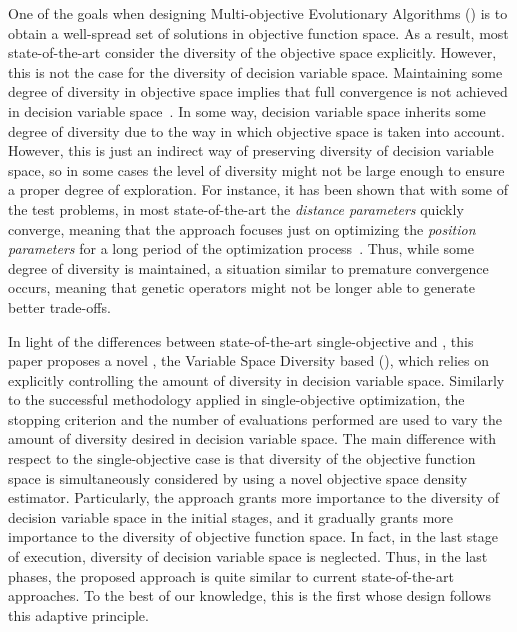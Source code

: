 One of the goals when designing Multi-objective Evolutionary Algorithms (\MOEAS{}) is to obtain a well-spread 
set of solutions in objective function space.
%
As a result, most state-of-the-art \MOEAS{} consider the diversity of the objective space explicitly.
%
However, this is not the case for the diversity of decision variable space.
%
Maintaining some degree of diversity in objective space implies that full convergence 
is not achieved in decision variable space~\citep{Joel:GDE3_CEC09}.
%
In some way, decision variable space inherits some degree of diversity due to the way in which objective space is 
taken into account. 
%
However, this is just an indirect way of preserving diversity of decision variable space, so 
in some cases the level of diversity might not be large enough to ensure a proper degree of exploration.
%
For instance, it has been shown that with some of the \WFG{} test problems, in most state-of-the-art \MOEAS{}
the \textit{distance parameters} quickly converge, meaning that the approach focuses just on optimizing the
\textit{position parameters} for a long period of the optimization process~\citep{castillo2017multi}.
%
Thus, while some degree of diversity is maintained, a situation similar to premature convergence occurs,
meaning that genetic operators might not be longer able to generate better trade-offs. 

In light of the differences between state-of-the-art single-objective \EAS{} and \MOEAS{}, 
this paper proposes a novel \MOEA{}, the Variable Space Diversity based \MOEA{} (\VSDMOEA{}), 
which relies on explicitly controlling the amount of diversity in decision variable space.
%
Similarly to the successful methodology applied in single-objective optimization, the stopping criterion and the 
number of evaluations performed are used to vary the amount of diversity desired in decision variable space.
%
The main difference with respect to the single-objective case is that diversity of the objective function space 
is simultaneously considered by using a novel objective space density estimator.
%
Particularly, the approach grants more importance to the diversity of decision variable space in the initial stages, and 
it gradually grants more importance to the diversity of objective function space.
%
In fact, in the last stage of execution, diversity of decision variable space is neglected. Thus, 
in the last phases, the proposed approach is quite similar to current state-of-the-art approaches.
%
To the best of our knowledge, this is the first \MOEA{} whose design follows this adaptive principle.

